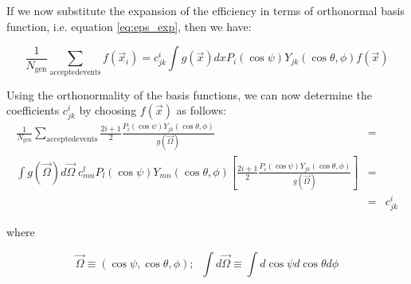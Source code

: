 \documentclass[a4paper,9pt,twosided]{article}
\begin{document}
If we now substitute the expansion of the efficiency in terms of orthonormal basis function,
i.e. equation \ref{eq:eps_exp}, then we have:

\begin{equation}
  \frac{1}{N_{\mathrm{gen}}} \sum_{\mathrm{accepted events}} f(\vec{x}_i) = c^i_{jk}  \int g(\vec{x})dx P_i(\cos\psi)Y_{jk}(\cos\theta,\phi)  f(\vec{x})
\end{equation}

Using the orthonormality of the basis functions, we can now determine the coefficients $c^i_{jk}$ 
by  choosing $f(\vec{x})$ as follows:
\begin{eqnarray}
\frac{1}{N_{\mathrm{gen}}} \sum_{\mathrm{accepted events}} \frac{2i+1}{2}\frac{ P_i(\cos\psi)Y_{jk}(\cos\theta,\phi) }{ g(\vec{\Omega}) }  &=&\\
    \int g(\vec{\Omega})d\vec{\Omega}\; c^l_{mn} P_l(\cos\psi)Y_{mn}(\cos\theta,\phi) \left[  \frac{2i+1}{2}\frac{ P_i(\cos\psi)Y_{jk}(\cos\theta,\phi) }{ g(\vec{\Omega}) } \right] &=&\\
    &=& c^i_{jk}
\end{eqnarray}

where

\begin{equation}
\vec{\Omega} \equiv (\cos\psi,\cos\theta,\phi);\;\; \int d\vec{\Omega} \equiv \int d\cos\psi d\cos\theta d\phi
\end{equation}
\end{document}
